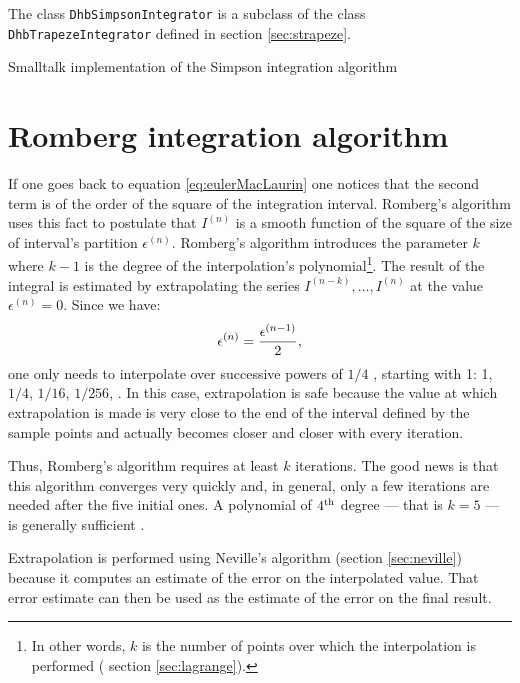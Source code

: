 \documentclass[twoside]{book}
\begin{document}
The class {\tt DhbSimpsonIntegrator} is a subclass of the class
{\tt DhbTrapezeIntegrator} defined in section \ref{sec:strapeze}.

\begin{listing} Smalltalk implementation of the Simpson integration algorithm \label{ls:simpson}

\end{listing}


\section{Romberg integration algorithm}
\label{sec:romberg} If one goes back to equation
\ref{eq:eulerMacLaurin} one notices that the second term is of the
order of the square of the integration interval. Romberg's
algorithm uses this fact to postulate that $I^{\left(n\right)}$ is
a smooth function of the square of the size of interval's
partition $\epsilon^{\left(n\right)}$. Romberg's algorithm
introduces the parameter $k$ where $k-1$ is the degree of the
interpolation's polynomial\footnote{In other words, $k$ is the
number of points over which the interpolation is performed (\cf
section \ref{sec:lagrange}).}. The result of the integral is
estimated by extrapolating the series
$I^{\left(n-k\right)},\ldots,I^{\left(n\right)}$ at the value
$\epsilon^{\left(n\right)}=0$. Since we have:
\begin{equation}
\epsilon^{\left(n\right)}={\epsilon^{\left(n-1\right)} \over 2},
\end{equation}
one only needs to interpolate over successive powers of $1/4$ ,
starting with 1: 1, $1/4$, $1/16$, $1/256$, \etc. In this case,
extrapolation is safe because the value at which extrapolation is
made is very close to the end of the interval defined by the
sample points and actually becomes closer and closer with every
iteration.

Thus, Romberg's algorithm requires at least $k$ iterations. The
good news is that this algorithm converges very quickly and, in
general, only a few iterations are needed after the five initial
ones. A polynomial of $4^{\mathop{\rm th}}$ degree --- that is
$k=5$ --- is generally sufficient \cite{Press}.

Extrapolation is performed using Neville's algorithm (\cf section
\ref{sec:neville}) because it computes an estimate of the error on
the interpolated value. That error estimate can then be used as
the estimate of the error on the final result.
\end{document}
